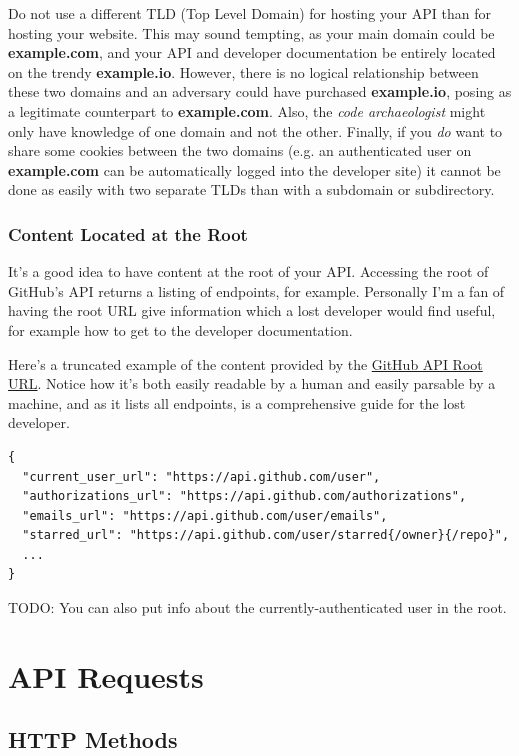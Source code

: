 \documentclass{book}
\begin{document}
Do not use a different TLD (Top Level Domain) for hosting your API than for hosting your website. This may sound tempting, as your main domain could be \textbf{example.com}, and your API and developer documentation be entirely located on the trendy \textbf{example.io}. However, there is no logical relationship between these two domains and an adversary could have purchased \textbf{example.io}, posing as a legitimate counterpart to \textbf{example.com}. Also, the \emph{code archaeologist} might only have knowledge of one domain and not the other. Finally, if you \emph{do} want to share some cookies between the two domains (e.g. an authenticated user on \textbf{example.com} can be automatically logged into the developer site) it cannot be done as easily with two separate TLDs than with a subdomain or subdirectory.

\subsection{Content Located at the Root}

It's a good idea to have content at the root of your API. Accessing the root of GitHub's API returns a listing of endpoints, for example. Personally I'm a fan of having the root URL give information which a lost developer would find useful, for example how to get to the developer documentation.

Here's a truncated example of the content provided by the \href{https://api.github.com/}{GitHub API Root URL}. Notice how it's both easily readable by a human and easily parsable by a machine, and as it lists all endpoints, is a comprehensive guide for the lost developer.

\begin{verbatim}
{
  "current_user_url": "https://api.github.com/user",
  "authorizations_url": "https://api.github.com/authorizations",
  "emails_url": "https://api.github.com/user/emails",
  "starred_url": "https://api.github.com/user/starred{/owner}{/repo}",
  ...
}
\end{verbatim}

TODO: You can also put info about the currently-authenticated user in the root.


\chapter{API Requests}

\section{HTTP Methods}
\end{document}
